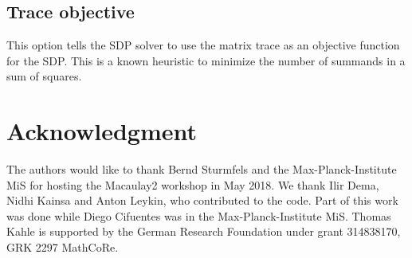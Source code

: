 \documentclass[11pt]{amsart}
\theoremstyle{plain}%
\theoremstyle{definition}
\theoremstyle{remark}
\newcommand{\Mac}{Macaulay2\xspace}
\begin{document}
\subsection*{Trace objective}
This option tells the SDP solver to use the matrix trace as an objective function for the SDP.
This is a known heuristic to minimize the number of summands in a sum of squares.


\section*{Acknowledgment}
\label{sec:acknowledgement}
The authors would like to thank Bernd Sturmfels and the Max-Planck-Institute MiS for hosting the \Mac workshop in May 2018.
We thank Ilir Dema, Nidhi Kainsa and Anton Leykin, who contributed to the code.
Part of this work was done while Diego Cifuentes was in the Max-Planck-Institute MiS.
Thomas Kahle is supported by the German Research Foundation under grant 314838170, GRK 2297 MathCoRe.



\end{document}
